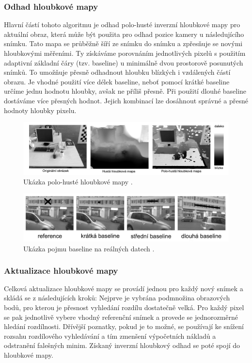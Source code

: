 \documentclass[12pt,a4paper]{article}
\begin{document}
\subsubsection{Odhad hloubkové mapy}
Hlavní částí tohoto algoritmu je odhad polo-husté inverzní hloubkové mapy pro aktuální obraz, která může být použita pro odhad pozice kamery u následujícího snímku. Tato mapa se průběžně šíří ze snímku do snímku a zpřesňuje se novými hloubkovými měřeními. Ty získáváme porovnáním jednotlivých pixelů s použitím adaptivní základní čáry (tzv. baseline) u minimálně dvou prostorově posunutých snímků. To umožňuje přesně odhadnout hloubku blízkých i vzdálených částí obrazu. Je vhodné použití více délek baseline, neboť pomocí krátké baseline určíme jednu hodnotu hloubky, avšak ne příliš přesně. Při použití dlouhé baseline dostáváme více přesných hodnot. Jejich kombinací lze dosáhnout správné a přesné hodnoty hloubky pixelu.

\begin{figure}[H]
\centering
\includegraphics[scale=0.7]{img/hloubkova_mapa.jpg}
\caption{Ukázka polo-husté hloubkové mapy \cite{Semi-Dense_VO}.}
\end{figure}

\begin{figure}[H]
\centering
\includegraphics[scale=0.4]{img/baseline.jpg}
\caption{Ukázka pojmu baseline na reálných datech \cite{Semi-Dense_VO}.}
\end{figure}

\subsubsection{Aktualizace hloubkové mapy}
Celková aktualizace hloubkové mapy se provádí jednou pro každý nový snímek a skládá se z následujících kroků: Nejprve je vybrána podmnožina obrazových bodů, pro kterou je přesnost vyhledání rozdílu dostatečně velká. Pro každý pixel se pak jednotlivě vybere vhodný referenční snímek a provede se jednorozměrné hledání rozdílnosti. Dřívější poznatky, pokud je to možné, se používají ke snížení rozsahu rozdílového vyhledávání a tím zmenšení výpočetních nákladů a odstranění falešných minim. Získaný inverzní hloubkový odhad se poté spojí do hloubkové mapy.
\end{document}
